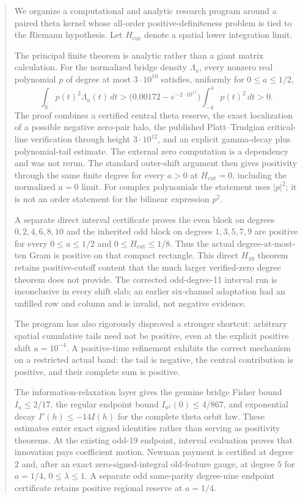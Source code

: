 \documentclass[11pt]{article}
\theoremstyle{definition}
\theoremstyle{remark}
\begin{document}
\begin{abstract}
We organize a computational and analytic research program around a paired theta
kernel whose all-order positive-definiteness problem is tied to the Riemann
hypothesis. Let $H_{\mathrm{cut}}$ denote a spatial lower integration limit.

The principal finite theorem is analytic rather than a giant matrix
calculation.  For the normalized bridge density $\Lambda_a$, every nonzero real
polynomial $p$ of degree at most $3\cdot10^{10}$ satisfies, uniformly for
$0\le a\le1/2$,
\[
 \int_{\mathbb R}p(t)^2\Lambda_a(t)\,dt
 >\bigl(0.00172-e^{-2\cdot10^{11}}\bigr)
   \int_{-4}^{4}p(t)^2\,dt>0.
\]
The proof combines a certified central theta reserve, the exact localization
of a possible negative zero-pair halo, the published Platt--Trudgian critical-line
verification through height $3\cdot10^{12}$, and an explicit gamma-decay plus
polynomial-tail estimate.  The external zero computation is a dependency and
was not rerun.  The standard outer-shift argument then gives positivity through
the same finite degree for every $a>0$ at $H_{\mathrm{cut}}=0$, including the
normalized $a=0$ limit.  For complex polynomials the statement uses $|p|^2$;
it is not an order statement for the bilinear expression $p^2$.

A separate direct interval certificate proves the even block on degrees
$0,2,4,6,8,10$ and the inherited odd block on degrees $1,3,5,7,9$ are positive
for every $0\le a\le1/2$ and $0\le H_{\mathrm{cut}}\le1/8$.  Thus the actual
degree-at-most-ten Gram is positive on that compact rectangle.  This direct
$H_{10}$ theorem retains positive-cutoff content that the much larger
verified-zero degree theorem does not provide.  The corrected odd-degree-11
interval run is inconclusive in every shift slab; an earlier six-channel
adaptation had an unfilled row and column and is invalid, not negative evidence.

The program has also rigorously disproved a stronger shortcut: arbitrary spatial
cumulative tails need not be positive, even at the explicit positive shift
$a=10^{-4}$. A positive-time refinement exhibits the correct mechanism on a
restricted actual band: the tail is negative, the central contribution is
positive, and their complete sum is positive.

The information-relaxation layer gives the genuine bridge Fisher bound
$I_a\le 2/17$, the regular endpoint bound $I_{a^2}(0)\le4/867$, and exponential
decay $I'(h)\le-14I(h)$ for the complete theta orbit law. These estimates enter
exact signed identities rather than serving as positivity theorems. At the
existing odd-19 endpoint, interval evaluation proves that innovation pays
coefficient motion. Newman payment is certified at degree $2$ and, after an
exact zero-signed-integral old-feature gauge, at degree $5$ for
$a=1/4$, $0\le\lambda\le1$. A separate odd same-parity degree-nine endpoint
certificate retains positive regional reserve at $a=1/4$.


\end{abstract}
\end{document}
